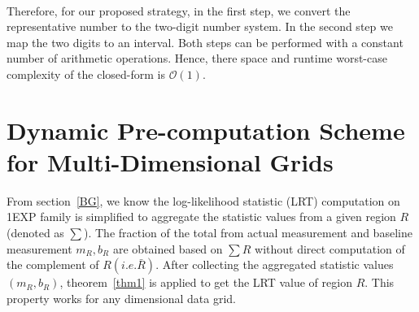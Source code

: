 \documentclass[AMA,LATO1COL]{WileyNJD-v2}
\newcommand\bigo{\mathcal O}
\begin{document}
\begin{table}[!ht]
  \centering
  \\
  \caption{Example: Interval Transformation for even/odd number of points }\label{maptable}
\end{table}


Therefore, for our proposed strategy, in the first step, we convert the representative number to the
two-digit number system.  In the second step we map the two digits to
an interval. Both steps can be performed with a constant number of
arithmetic operations. Hence, there space and runtime worst-case
complexity of the closed-form is $\bigo(1)$.


\section{Dynamic Pre-computation Scheme for Multi-Dimensional Grids}
\label{sec:dy}
From section~\ref{BG}, we know the log-likelihood statistic (LRT)
computation on 1EXP family is simplified to aggregate the statistic
values from a given region $R$ (denoted as $\sum $). The fraction of
the total from actual measurement and baseline measurement $m_R,b_R$
are obtained based on $\sum R$ without direct computation of the
complement of $R (i.e. \bar R)$. After collecting the aggregated
statistic values $(m_R,b_R)$, theorem~\ref{thm1} is applied to get the
LRT value of region $R$. This property works for any dimensional data grid.
\end{document}
